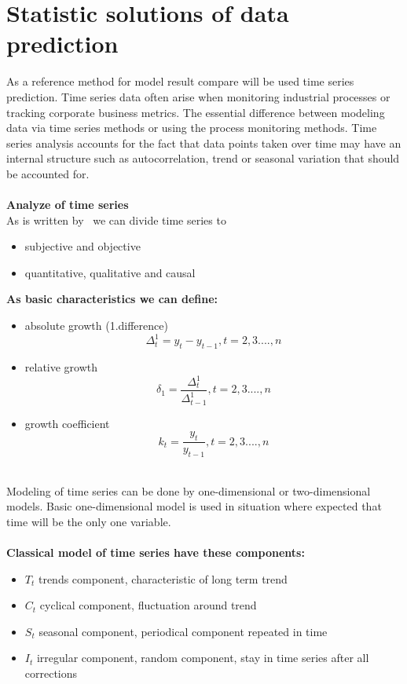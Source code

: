 \section{Statistic solutions of data prediction} \label{sec:statistics}
As a reference method for model result compare will be used time series prediction.
Time series data often arise when monitoring industrial processes or tracking corporate business metrics.
The essential difference between modeling data via time series methods or using the process monitoring methods.
Time series analysis accounts for the fact that data points taken over time may have an internal structure such as autocorrelation,
trend or seasonal variation that should be accounted for.\\
\\
\textbf{Analyze of time series} \label{subsec:statistics_analyze}\\
As is written by~\cite{benkova} we can divide time series to
\begin{itemize}
	\item subjective and objective
	\item quantitative, qualitative and causal
\end{itemize}
\textbf{As basic characteristics we can define:}
\begin{itemize}
	\item absolute growth (1.difference)
	\begin{equation} \label{eq:18}
	\Delta_t^1 = y_t - y_{t-1}, t = 2,3 ....,n
	\end{equation}
	\item relative growth
	\begin{equation} \label{eq:19}
	\delta_1 = \frac{\Delta_t^1}{\Delta_{t-1}^1}, t = 2,3 ....,n
	\end{equation}
	\item growth coefficient
	\begin{equation} \label{eq:20}
	k_t = \frac{y_t}{y_{t-1}}, t = 2,3 ....,n
	\end{equation}
\end{itemize}
\\
Modeling of time series can be done by one-dimensional or two-dimensional models.
Basic one-dimensional model is used in situation where expected that time will be the only one variable.\\
\\
\textbf{Classical model of time series have these components:}
\begin{itemize}
	\item $T_t$ trends component, characteristic of long term trend
	\item $C_t$ cyclical component, fluctuation around trend
	\item $S_t$ seasonal component, periodical component repeated in time
	\item $I_t$ irregular component, random component, stay in time series after all corrections
\end{itemize}
